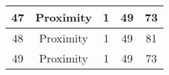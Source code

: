 \documentclass[results.tex]{subfiles}
\begin{document}
\begin{center}
\begin{tabular}{| c || c | c | c | c |}
            \hline
            47                      & Proximity                    & 1                      & 49                      & 73                   \\
            \hline
            48                      & Proximity                    & 1                      & 49                      & 81                   \\
            \hline
            49                      & Proximity                    & 1                      & 49                      & 73                   \\
            \hline
        \end{tabular}
    \end{center}
\end{document}
